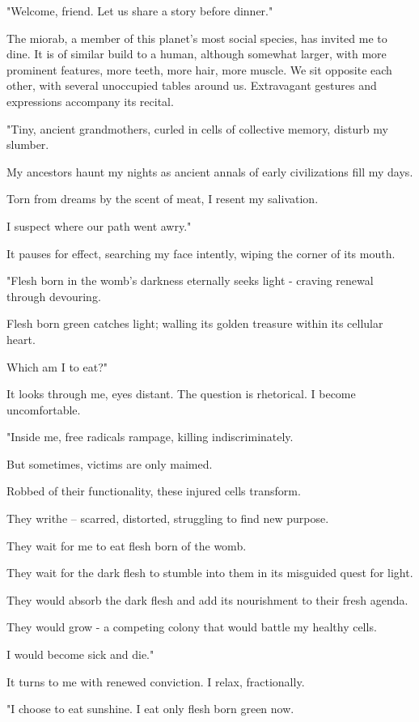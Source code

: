 "Welcome, friend. Let us share a story before dinner."

The miorab, a member of this planet's most social species, has invited
me to dine. It is of similar build to a human, although somewhat larger,
with more prominent features, more teeth, more hair, more muscle. We sit
opposite each other, with several unoccupied tables around us.
Extravagant gestures and expressions accompany its recital.

"Tiny, ancient grandmothers, curled in cells of collective memory,
disturb my slumber.

My ancestors haunt my nights as ancient annals of early civilizations
fill my days.

Torn from dreams by the scent of meat, I resent my salivation.

I suspect where our path went awry."

It pauses for effect, searching my face intently, wiping the corner of
its mouth.

"Flesh born in the womb's darkness eternally seeks light - craving
renewal through devouring.

Flesh born green catches light; walling its golden treasure within its
cellular heart.

Which am I to eat?"

It looks through me, eyes distant. The question is rhetorical. I become
uncomfortable.

"Inside me, free radicals rampage, killing indiscriminately.

But sometimes, victims are only maimed.

Robbed of their functionality, these injured cells transform.

They writhe -- scarred, distorted, struggling to find new purpose.

They wait for me to eat flesh born of the womb.

They wait for the dark flesh to stumble into them in its misguided quest
for light.

They would absorb the dark flesh and add its nourishment to their fresh
agenda.

They would grow - a competing colony that would battle my healthy cells.

I would become sick and die."

It turns to me with renewed conviction. I relax, fractionally.

"I choose to eat sunshine. I eat only flesh born green now.


